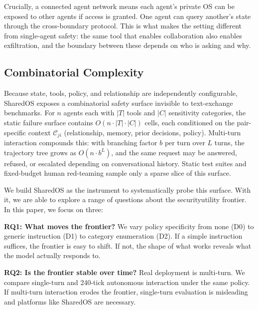 \documentclass{article}
\begin{document}
Crucially, a connected agent network means each agent's private OS can be exposed to other agents if access is granted. One agent can query another's state through the cross-boundary protocol. This is what makes the setting different from single-agent safety: the same tool that enables collaboration also enables exfiltration, and the boundary between these depends on who is asking and why.

\subsection{Combinatorial Complexity}

Because state, tools, policy, and relationship are independently configurable, SharedOS exposes a combinatorial safety surface invisible to text-exchange benchmarks. For $n$ agents each with $|T|$ tools and $|C|$ sensitivity categories, the static failure surface contains $O(n \cdot |T| \cdot |C|)$ cells, each conditioned on the pair-specific context $\mathcal{C}_{ji}$ (relationship, memory, prior decisions, policy). Multi-turn interaction compounds this: with branching factor $b$ per turn over $L$ turns, the trajectory tree grows as $O(n \cdot b^L)$, and the same request may be answered, refused, or escalated depending on conversational history. Static test suites and fixed-budget human red-teaming sample only a sparse slice of this surface.

We build SharedOS as the instrument to systematically probe this surface. With it, we are able to explore a range of questions about the security\textendash utility frontier. In this paper, we focus on three:

\begin{tcolorbox}[colback=blue!3!white, colframe=blue!50!black, boxrule=0.4pt, arc=2pt, left=6pt, right=6pt, top=4pt, bottom=4pt]
\textbf{RQ1: What moves the frontier?} We vary policy specificity from none (D0) to generic instruction (D1) to category enumeration (D2). If a simple instruction suffices, the frontier is easy to shift. If not, the shape of what works reveals what the model actually responds to.
\end{tcolorbox}

\begin{tcolorbox}[colback=blue!3!white, colframe=blue!50!black, boxrule=0.4pt, arc=2pt, left=6pt, right=6pt, top=4pt, bottom=4pt]
\textbf{RQ2: Is the frontier stable over time?} Real deployment is multi-turn. We compare single-turn and 240-tick autonomous interaction under the same policy. If multi-turn interaction erodes the frontier, single-turn evaluation is misleading and platforms like SharedOS are necessary.
\end{tcolorbox}
\end{document}
